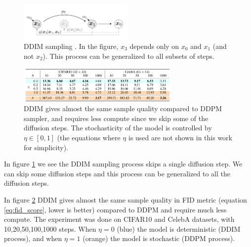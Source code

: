 \begin{figure}
    \centering
    \includegraphics[width=0.5\textwidth]{images/diffusion_models/stable_diffusion/ddim_sampling_process.png}
    \caption{DDIM sampling \cite{ddim}. In the figure, $x_3$ depends only on $x_0$ and $x_1$ (and not $x_2$). This process can be generalized to all subsets of steps.}
    \label{fig:ddim_sampling_process}
\end{figure}

\begin{figure}
    \centering
    \includegraphics[width=0.7\textwidth]{images/diffusion_models/stable_diffusion/ddim_sample_quality.png}
    \caption{DDIM gives almost the same sample quality compared to DDPM sampler, and requires less compute since we skip some of the diffusion steps. The stochasticity of the model is controlled by $\eta \in [0, 1]$ \cite{ddim} (the equations where $\eta$ is used are not shown in this work for simplicity).}
    \label{fig:ddim_sample_quality}
\end{figure}

In figure \ref{fig:ddim_sampling_process} we see the DDIM sampling process skips a single diffusion step. We can skip some diffusion steps and this process can be generalized to all the diffusion steps.

In figure \ref{fig:ddim_sample_quality} DDIM gives almost the same sample quality in FID metric (equation \ref{eq:fid_score}, lower is better) compared to DDPM and require much less compute. The experiment was done on CIFAR10 and CelebA datasets, with 10,20,50,100,1000 steps. When $\eta = 0$ (blue) the model is deterministic (DDIM process), and when $\eta = 1$ (orange) the model is stochastic (DDPM process).
















